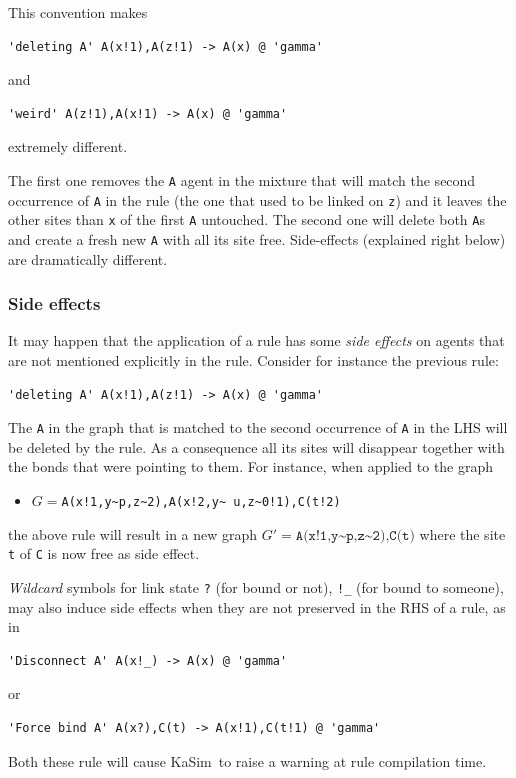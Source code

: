 \documentclass[11pt]{book}
\def\KaSim{\textsf{KaSim}}
\def\intstate{\textasciitilde}
\def\ttt#1{\texttt{#1}}
\def\ITE#1{\begin{itemize}#1\end{itemize}}
\begin{document}
This convention makes
\begin{lstlisting}[language=kappa]
'deleting A' A(x!1),A(z!1) -> A(x) @ 'gamma'
\end{lstlisting}
and
\begin{lstlisting}[language=kappa]
'weird' A(z!1),A(x!1) -> A(x) @ 'gamma'
\end{lstlisting}
extremely different.

The first one removes the \ttt{A} agent in the mixture
that will match the second occurrence of \ttt{A} in the rule (the one
that used to be linked on \ttt{z}) and it leaves the other sites than
\ttt{x} of the first \ttt{A} untouched.  The second one will delete
both \ttt{A}s and create a fresh new \ttt{A} with all its site
free. Side-effects (explained right below) are dramatically different.

\subsubsection*{Side effects}\label{sec:side-effect}

It may happen that the application of a rule has some \emph{side
  effects} on agents that are not mentioned
explicitly in the rule. Consider for instance the previous rule:
\begin{lstlisting}[language=kappa]
'deleting A' A(x!1),A(z!1) -> A(x) @ 'gamma'
\end{lstlisting}
The \ttt{A} in the graph that is matched to the second occurrence of
\ttt{A} in the LHS will be deleted by the rule. As a consequence all
its sites will disappear together with the bonds that were pointing to
them. For instance, when applied to the graph \ITE{
\item[] $G=$\ttt{A(x!1,y\intstate p,z\intstate2),A(x!2,y\intstate
  u,z\intstate0!1),C(t!2)} } the above rule will result in a new graph
$G' =\ttt{A(x!1,y{\intstate}p,z\intstate2),C(t)}$ where the site
\ttt{t} of \ttt{C} is now free as side effect.

\emph{Wildcard} symbols for link state \ttt{?} (for bound or not),
\ttt{!\_} (for bound to someone), may also induce side effects when
they are not preserved in the RHS of a rule, as in
\begin{lstlisting}[language=kappa]
'Disconnect A' A(x!_) -> A(x) @ 'gamma'
\end{lstlisting}
or
\begin{lstlisting}[language=kappa]
'Force bind A' A(x?),C(t) -> A(x!1),C(t!1) @ 'gamma'
\end{lstlisting}
Both these rule will cause \KaSim~to raise a warning at rule compilation time.
\end{document}

